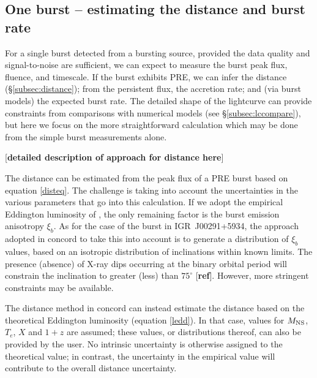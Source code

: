 \documentclass{aastex63}
\begin{document}
\subsection{One burst -- estimating the distance and burst rate} 
\label{subsec:1burst}


For a single burst detected from a bursting source, provided the data quality and signal-to-noise are sufficient, we can expect to measure the burst peak flux, fluence, and timescale. If the burst exhibits PRE, we can infer the distance (\S\ref{subsec:distance}); from the persistent flux, the accretion rate; and (via burst models) the expected burst rate. The detailed shape of the lightcurve can provide constraints from comparisons with numerical models (see \S\ref{subsec:lccompare}), but here we focus on the more straightforward calculation which may be done from the simple burst measurements alone. 

[{\bf detailed description of approach for distance here}]

The distance can be estimated from the peak flux of a PRE burst based on equation \ref{disteq}. The challenge is taking into account the uncertainties in the various parameters that go into this calculation. If we adopt the empirical Eddington luminosity of \cite[]{kuul03a}, the only remaining factor is the burst emission anisotropy $\xi_b$.
%
As for the case of the burst in IGR~J00291+5934, the approach adopted in {\sc concord} to take this into account is to generate a distribution of $\xi_b$ values, based on an isotropic distribution of inclinations within known limits. The presence (absence) of X-ray dips occurring at the binary orbital period will constrain the inclination to greater (less) than $75^\circ$ [{\bf ref}]. However, more stringent constraints may be available.

The distance method in {\sc concord} can instead estimate the distance based on the theoretical Eddington luminosity (equation \ref{ledd}). In that case, values for $M_{\rm NS}$, $T_e$, $X$ and $1+z$ are assumed; these values, or distributions thereof, can also be provided by the user. No intrinsic uncertainty is otherwise assigned to the theoretical value; in contrast, the uncertainty in the empirical value will contribute to the overall distance uncertainty.

\end{document}
